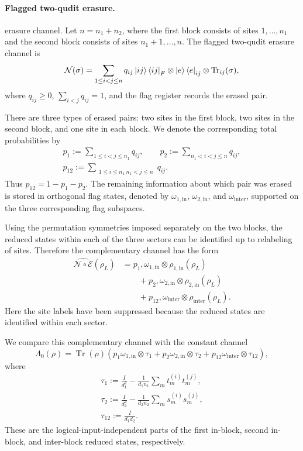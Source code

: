 \documentclass[10pt,twocolumn,superscriptaddress,aps,amsmath,amssymb,citeautoscript,floatfix,prx]{revtex4-2}
\theoremstyle{plain}
\theoremstyle{plain}
\theoremstyle{plain}
\theoremstyle{plain}
\theoremstyle{plain}
\theoremstyle{plain}
\begin{document}
\paragraph{Flagged two-qudit erasure.}

 erasure channel. Let $n=n_1+n_2$, where the first block consists of sites $1,\ldots,n_1$ and the second block consists of sites $n_1+1,\ldots,n$. The flagged two-qudit erasure channel is
$$
\mathcal N(\sigma)
=
\sum_{1\le i<j\le n}
q_{ij}
\ket{ij}\bra{ij}_F
\otimes
\ket e\bra e_{ij}
\otimes
\operatorname{Tr}_{ij}(\sigma),
$$
where $q_{ij}\ge 0$, $\sum_{i<j}q_{ij}=1$, and the flag register records the erased pair.

There are three types of erased pairs: two sites in the first block, two sites in the second block, and one site in each block. We denote the corresponding total probabilities by
$$
\begin{gathered}
p_1
:=
\sum_{1\le i<j\le n_1}
q_{ij},
\qquad
p_2
:=
\sum_{n_1<i<j\le n}
q_{ij},
\\
p_{12}
:=
\sum_{\substack{1\le i\le n_1\ n_1<j\le n}}
q_{ij}.
\end{gathered}
$$
Thus $p_{12}=1-p_1-p_2$. The remaining information about which pair was erased is stored in orthogonal flag states, denoted by $\omega_{1,\mathrm{in}}$, $\omega_{2,\mathrm{in}}$, and $\omega_{\mathrm{inter}}$, supported on the three corresponding flag subspaces.

Using the permutation symmetries imposed separately on the two blocks, the reduced states within each of the three sectors can be identified up to relabeling of sites. Therefore the complementary channel has the form
$$
\begin{aligned}
\widehat{\mathcal N\circ\mathcal E}(\rho_L)
&=
p_1,
\omega_{1,\mathrm{in}}
\otimes
\rho_{1,\mathrm{in}}(\rho_L)
\\
&\qquad
+
p_2,
\omega_{2,\mathrm{in}}
\otimes
\rho_{2,\mathrm{in}}(\rho_L)
\\
&\qquad
+
p_{12},
\omega_{\mathrm{inter}}
\otimes
\rho_{\mathrm{inter}}(\rho_L).
\end{aligned}
$$
Here the site labels have been suppressed because the reduced states are identified within each sector.

We compare this complementary channel with the constant channel
$$
\Lambda_0(\rho)
=
\operatorname{Tr}(\rho)
\left(
p_1\omega_{1,\mathrm{in}}\otimes\tau_1
+
p_2\omega_{2,\mathrm{in}}\otimes\tau_2
+
p_{12}\omega_{\mathrm{inter}}\otimes\tau_{12}
\right),
$$
where
$$
\begin{gathered}
\tau_1
:=
\frac{I}{d_1^2}
-
\frac{1}{d_1n_1}
\sum_m t_m^{(i)}t_m^{(j)},
\\
\tau_2
:=
\frac{I}{d_2^2}
-
\frac{1}{d_2n_2}
\sum_m s_m^{(i)}s_m^{(j)},
\\
\tau_{12}
:=
\frac{I}{d_1d_2}.
\end{gathered}
$$
These are the logical-input-independent parts of the first in-block, second in-block, and inter-block reduced states, respectively.
\end{document}
